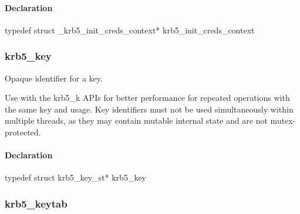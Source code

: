 \documentclass[letterpaper,10pt,english]{sphinxmanual}
\begin{document}
\begin{fulllineitems}
\label{appdev/refs/types/krb5_init_creds_context:c.krb5_init_creds_context}
\end{fulllineitems}



\paragraph{Declaration}
\label{appdev/refs/types/krb5_init_creds_context:declaration}
typedef struct \_krb5\_init\_creds\_context* krb5\_init\_creds\_context


\subsubsection{krb5\_key}
\label{appdev/refs/types/krb5_key::doc}\label{appdev/refs/types/krb5_key:krb5-key}\label{appdev/refs/types/krb5_key:krb5-key-struct}

\begin{fulllineitems}
\label{appdev/refs/types/krb5_key:c.krb5_key}
\end{fulllineitems}


Opaque identifier for a key.

Use with the krb5\_k APIs for better performance for repeated operations with the same key and usage. Key identifiers must not be used simultaneously within multiple threads, as they may contain mutable internal state and are not mutex-protected.


\paragraph{Declaration}
\label{appdev/refs/types/krb5_key:declaration}
typedef struct krb5\_key\_st* krb5\_key


\subsubsection{krb5\_keytab}
\label{appdev/refs/types/krb5_keytab:krb5-keytab}\label{appdev/refs/types/krb5_keytab::doc}\label{appdev/refs/types/krb5_keytab:krb5-keytab-struct}

\begin{fulllineitems}
\label{appdev/refs/types/krb5_keytab:c.krb5_keytab}
\end{fulllineitems}
\end{document}
